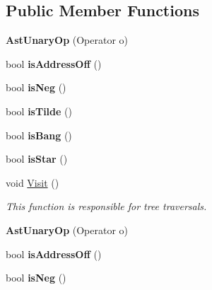\subsection*{Public Member Functions}
\begin{DoxyCompactItemize}
\item 
\hypertarget{classAstUnaryOp_aa363b2df2fbb4653a683899e59df2080}{{\bfseries Ast\-Unary\-Op} (Operator o)}\label{classAstUnaryOp_aa363b2df2fbb4653a683899e59df2080}

\item 
\hypertarget{classAstUnaryOp_a636862fa8cc5f8308eeed666e8cce5a4}{bool {\bfseries is\-Address\-Off} ()}\label{classAstUnaryOp_a636862fa8cc5f8308eeed666e8cce5a4}

\item 
\hypertarget{classAstUnaryOp_a7dddcaa6c182d6012e35d124c25c8e22}{bool {\bfseries is\-Neg} ()}\label{classAstUnaryOp_a7dddcaa6c182d6012e35d124c25c8e22}

\item 
\hypertarget{classAstUnaryOp_a02f2cdfdcf75a4c41cfd2168465c16b0}{bool {\bfseries is\-Tilde} ()}\label{classAstUnaryOp_a02f2cdfdcf75a4c41cfd2168465c16b0}

\item 
\hypertarget{classAstUnaryOp_ab9c6693eaa03da4daf18dc43f01c73d5}{bool {\bfseries is\-Bang} ()}\label{classAstUnaryOp_ab9c6693eaa03da4daf18dc43f01c73d5}

\item 
\hypertarget{classAstUnaryOp_aab9cd20f2a71757480827cb44b7cb0a3}{bool {\bfseries is\-Star} ()}\label{classAstUnaryOp_aab9cd20f2a71757480827cb44b7cb0a3}

\item 
void \hyperlink{classAstUnaryOp_a23e13d42f33d5882d58ca48e8053f1a0}{Visit} ()
\begin{DoxyCompactList}\small\item\em This function is responsible for tree traversals. \end{DoxyCompactList}\item 
\hypertarget{classAstUnaryOp_aa363b2df2fbb4653a683899e59df2080}{{\bfseries Ast\-Unary\-Op} (Operator o)}\label{classAstUnaryOp_aa363b2df2fbb4653a683899e59df2080}

\item 
\hypertarget{classAstUnaryOp_a636862fa8cc5f8308eeed666e8cce5a4}{bool {\bfseries is\-Address\-Off} ()}\label{classAstUnaryOp_a636862fa8cc5f8308eeed666e8cce5a4}

\item 
\hypertarget{classAstUnaryOp_a7dddcaa6c182d6012e35d124c25c8e22}{bool {\bfseries is\-Neg} ()}\label{classAstUnaryOp_a7dddcaa6c182d6012e35d124c25c8e22}


\end{DoxyCompactItemize}
